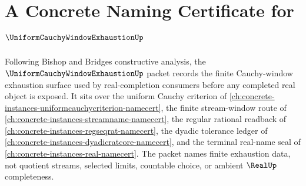 \chapter{A Concrete Naming Certificate for $\UniformCauchyWindowExhaustionUp$}
\label{ch:concrete-instances-uniform-cauchy-window-exhaustion-namecert}

Following Bishop and Bridges constructive analysis, the $\UniformCauchyWindowExhaustionUp$ packet records the finite Cauchy-window exhaustion surface used by real-completion consumers before any completed real object is exposed. It sits over the uniform Cauchy criterion of \autoref{ch:concrete-instances-uniformcauchycriterion-namecert}, the finite stream-window route of \autoref{ch:concrete-instances-streamname-namecert}, the regular rational readback of \autoref{ch:concrete-instances-regseqrat-namecert}, the dyadic tolerance ledger of \autoref{ch:concrete-instances-dyadicratcore-namecert}, and the terminal real-name seal of \autoref{ch:concrete-instances-real-namecert}. The packet names finite exhaustion data, not quotient streams, selected limits, countable choice, or ambient $\RealUp$ completeness.

